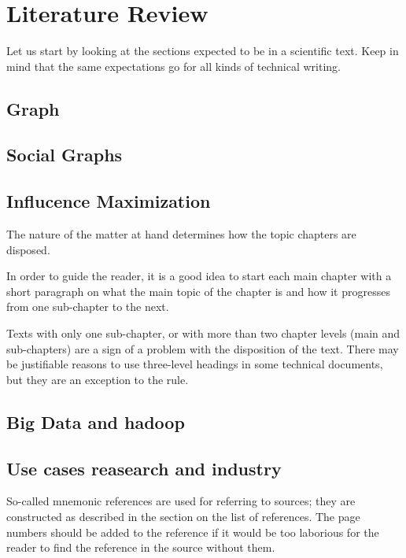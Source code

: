 \documentclass[english]{tktltiki}
\begin{document}
\section{Literature Review}

Let us start by looking at the sections expected to be in a scientific text. Keep in mind that the same expectations go for all kinds of technical writing.

\subsection{Graph}




\subsection{Social Graphs}




\subsection{Influcence Maximization}

The nature of the matter at hand determines how the topic chapters are disposed.

In order to guide the reader, it is a good idea to start each main chapter with a short paragraph 
on what the main topic of the chapter is and how it progresses from one sub-chapter to the next.

Texts with only one sub-chapter, or with more than two chapter levels (main and sub-chapters) are a 
sign of a problem with the disposition of the text. There may be justifiable reasons to use three-level 
headings in some technical documents, but they are an exception to the rule.

\subsection{Big Data and hadoop}

\subsection{Use cases reasearch and industry}


So-called mnemonic references are used for referring to sources; they are constructed as described 
in the section on the list of references. The page numbers should be added to the reference if it would 
be too laborious for the reader to find the reference in the source without them. 
\end{document}
